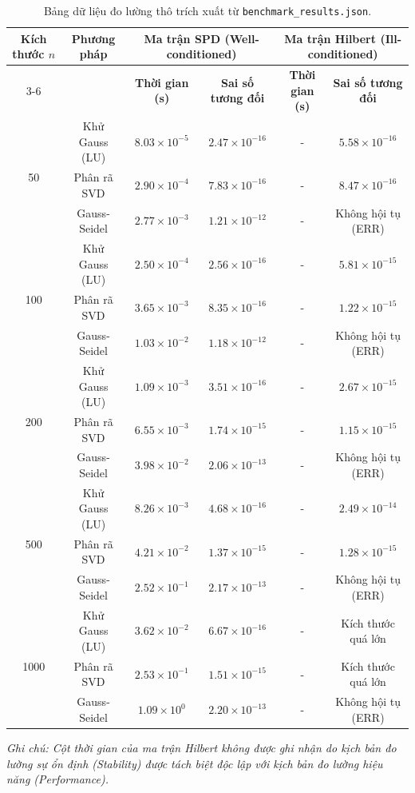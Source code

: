 \begin{table}
    \centering
    \renewcommand{\arraystretch}{1.3}
    \begin{tabular}{|c|c|c|c|c|c|}
        \hline
        \multirow{2}{*}{\textbf{Kích thước $n$}} & \multirow{2}{*}{\textbf{Phương pháp}} & \multicolumn{2}{c|}{\textbf{Ma trận SPD (Well-conditioned)}} & \multicolumn{2}{c|}{\textbf{Ma trận Hilbert (Ill-conditioned)}} \\
        \cline{3-6}
        & & \textbf{Thời gian (s)} & \textbf{Sai số tương đối} & \textbf{Thời gian (s)} & \textbf{Sai số tương đối} \\
        \hline
        \multirow{3}{*}{50} 
        & Khử Gauss (LU) & $8.03 \times 10^{-5}$ & $2.47 \times 10^{-16}$ & - & $5.58 \times 10^{-16}$ \\
        & Phân rã SVD & $2.90 \times 10^{-4}$ & $7.83 \times 10^{-16}$ & - & $8.47 \times 10^{-16}$ \\
        & Gauss-Seidel & $2.77 \times 10^{-3}$ & $1.21 \times 10^{-12}$ & - & Không hội tụ (ERR) \\
        \hline
        \multirow{3}{*}{100} 
        & Khử Gauss (LU) & $2.50 \times 10^{-4}$ & $2.56 \times 10^{-16}$ & - & $5.81 \times 10^{-15}$ \\
        & Phân rã SVD & $3.65 \times 10^{-3}$ & $8.35 \times 10^{-16}$ & - & $1.22 \times 10^{-15}$ \\
        & Gauss-Seidel & $1.03 \times 10^{-2}$ & $1.18 \times 10^{-12}$ & - & Không hội tụ (ERR) \\
        \hline
        \multirow{3}{*}{200} 
        & Khử Gauss (LU) & $1.09 \times 10^{-3}$ & $3.51 \times 10^{-16}$ & - & $2.67 \times 10^{-15}$ \\
        & Phân rã SVD & $6.55 \times 10^{-3}$ & $1.74 \times 10^{-15}$ & - & $1.15 \times 10^{-15}$ \\
        & Gauss-Seidel & $3.98 \times 10^{-2}$ & $2.06 \times 10^{-13}$ & - & Không hội tụ (ERR) \\
        \hline
        \multirow{3}{*}{500} 
        & Khử Gauss (LU) & $8.26 \times 10^{-3}$ & $4.68 \times 10^{-16}$ & - & $2.49 \times 10^{-14}$ \\
        & Phân rã SVD & $4.21 \times 10^{-2}$ & $1.37 \times 10^{-15}$ & - & $1.28 \times 10^{-15}$ \\
        & Gauss-Seidel & $2.52 \times 10^{-1}$ & $2.17 \times 10^{-13}$ & - & Không hội tụ (ERR) \\
        \hline
        \multirow{3}{*}{1000} 
        & Khử Gauss (LU) & $3.62 \times 10^{-2}$ & $6.67 \times 10^{-16}$ & - & Kích thước quá lớn \\
        & Phân rã SVD & $2.53 \times 10^{-1}$ & $1.51 \times 10^{-15}$ & - & Kích thước quá lớn \\
        & Gauss-Seidel & $1.09 \times 10^{0}$ & $2.20 \times 10^{-13}$ & - & Không hội tụ (ERR) \\
        \hline
    \end{tabular}
    \caption{Bảng dữ liệu đo lường thô trích xuất từ \texttt{benchmark\_results.json}.}
    \label{tab:appendix_raw_data}
\end{table}

\textit{Ghi chú: Cột thời gian của ma trận Hilbert không được ghi nhận do kịch bản đo lường sự ổn định (Stability) được tách biệt độc lập với kịch bản đo lường hiệu năng (Performance).}